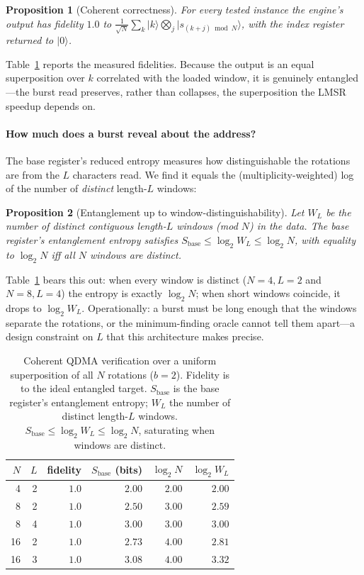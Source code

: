 \documentclass[11pt]{article}
\newtheorem{proposition}{Proposition}
\theoremstyle{definition}
\begin{document}
\begin{proposition}[Coherent correctness]
\label{prop:correct}
For every tested instance the engine's output has fidelity $1.0$ to
$\tfrac{1}{\sqrt N}\sum_k \lvert k\rangle\bigotimes_j \lvert s_{(k+j)\bmod N}
\rangle$, with the index register returned to $\lvert 0\rangle$.
\end{proposition}
\noindent Table~\ref{tab:verify} reports the measured fidelities. Because the
output is an equal superposition over $k$ correlated with the loaded window, it is
genuinely entangled---the burst read preserves, rather than collapses, the
superposition the LMSR speedup depends on.

\paragraph{How much does a burst reveal about the address?} The base register's
reduced entropy measures how distinguishable the rotations are from the $L$
characters read. We find it equals the (multiplicity-weighted) log of the number of
\emph{distinct} length-$L$ windows:
\begin{proposition}[Entanglement up to window-distinguishability]
\label{prop:entropy}
Let $W_L$ be the number of distinct contiguous length-$L$ windows (mod $N$) in the
data. The base register's entanglement entropy satisfies $S_{\mathrm{base}}\le
\log_2 W_L \le \log_2 N$, with equality to $\log_2 N$ iff all $N$ windows are
distinct.
\end{proposition}
\noindent Table~\ref{tab:verify} bears this out: when every window is distinct
($N{=}4,L{=}2$ and $N{=}8,L{=}4$) the entropy is exactly $\log_2 N$; when short
windows coincide, it drops to $\log_2 W_L$. Operationally: a burst must be long
enough that the windows separate the rotations, or the minimum-finding oracle
cannot tell them apart---a design constraint on $L$ that this architecture makes
precise.

\begin{table}[t]
\centering
\caption{Coherent QDMA verification over a uniform superposition of all $N$
rotations ($b=2$). Fidelity is to the ideal entangled target. $S_{\mathrm{base}}$
is the base register's entanglement entropy; $W_L$ the number of distinct
length-$L$ windows. $S_{\mathrm{base}}\le\log_2 W_L\le\log_2 N$, saturating when
windows are distinct.}
\label{tab:verify}
\begin{tabular}{rrrrrr}
\toprule
$N$ & $L$ & fidelity & $S_{\mathrm{base}}$ (bits) & $\log_2 N$ & $\log_2 W_L$ \\
\midrule
4  & 2 & $1.0$ & $2.00$ & $2.00$ & $2.00$ \\
8  & 2 & $1.0$ & $2.50$ & $3.00$ & $2.59$ \\
8  & 4 & $1.0$ & $3.00$ & $3.00$ & $3.00$ \\
16 & 2 & $1.0$ & $2.73$ & $4.00$ & $2.81$ \\
16 & 3 & $1.0$ & $3.08$ & $4.00$ & $3.32$ \\
\bottomrule
\end{tabular}
\end{table}
\end{document}
